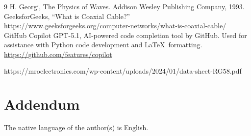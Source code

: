 \documentclass[11pt]{article}
\begin{document}
\begin{thebibliography}{9}
  H. Georgi, The Physics of Waves. Addison Wesley Publishing Company, 1993.
  GeeksforGeeks, ``What is Coaxial Cable?'' \url{https://www.geeksforgeeks.org/computer-networks/what-is-coaxial-cable/}
  GitHub Copilot GPT-5.1, AI-powered code completion tool by GitHub. Used for assistance with Python code development and \LaTeX\ formatting. \url{https://github.com/features/copilot}

   https://mroelectronics.com/wp-content/uploads/2024/01/data-sheet-RG58.pdf
\end{thebibliography}

\section*{Addendum}
The native language of the author(s) is English.
\end{document}

